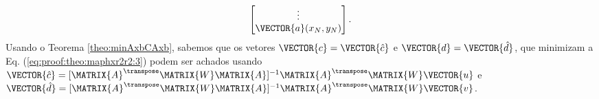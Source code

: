 \begin{myproofT}
\begin{equation}
\begin{bmatrix}
\vdots\\
\VECTOR{a}(x_N,y_N)
\end{bmatrix}.
\end{equation}
Usando o Teorema \ref{theo:minAxbCAxb}, sabemos que os vetores $\VECTOR{c}=\VECTOR{\hat{c}}$ e $\VECTOR{d}=\VECTOR{\hat{d}}$,
que minimizam a Eq. (\ref{eq:proof:theo:maphxr2r2:3}) podem ser achados usando 
$\VECTOR{\hat{c}}=[\MATRIX{A}^{\transpose}\MATRIX{W}\MATRIX{A}]^{-1}\MATRIX{A}^{\transpose}\MATRIX{W}\VECTOR{u}$ e
$\VECTOR{\hat{d}}=[\MATRIX{A}^{\transpose}\MATRIX{W}\MATRIX{A}]^{-1}\MATRIX{A}^{\transpose}\MATRIX{W}\VECTOR{v}$.
\begin{comment}
\begin{equation}\label{eq:proof:theo:maphxr2r2:5}
\VECTOR{\hat{c}}=[\MATRIX{A}^{\transpose}\MATRIX{W}\MATRIX{A}]^{-1}\MATRIX{A}^{\transpose}\MATRIX{W}\VECTOR{u},
\qquad
\VECTOR{\hat{d}}=[\MATRIX{A}^{\transpose}\MATRIX{W}\MATRIX{A}]^{-1}\MATRIX{A}^{\transpose}\MATRIX{W}\VECTOR{v}.
\end{equation}
\end{comment}
\end{myproofT}


